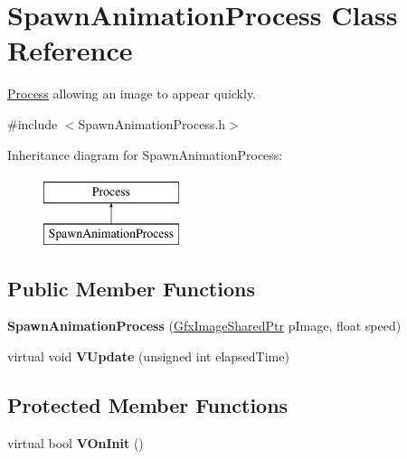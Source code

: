 \hypertarget{classSpawnAnimationProcess}{\section{Spawn\-Animation\-Process Class Reference}
\label{classSpawnAnimationProcess}
}


\hyperlink{classProcess}{Process} allowing an image to appear quickly.  




{\ttfamily \#include $<$Spawn\-Animation\-Process.\-h$>$}

Inheritance diagram for Spawn\-Animation\-Process\-:\begin{figure}[H]
\begin{center}
\leavevmode
\includegraphics[height=2.000000cm]{classSpawnAnimationProcess}
\end{center}
\end{figure}
\subsection*{Public Member Functions}
\begin{DoxyCompactItemize}
\item 
\hypertarget{classSpawnAnimationProcess_a74fbba9846f1148750f8817cd81eafb3}{{\bfseries Spawn\-Animation\-Process} (\hyperlink{GfxImage_8h_a42b2baf6110731a1a358d365e303e086}{Gfx\-Image\-Shared\-Ptr} p\-Image, float speed)}\label{classSpawnAnimationProcess_a74fbba9846f1148750f8817cd81eafb3}

\item 
\hypertarget{classSpawnAnimationProcess_a208194c75a8af12d0cc68f07c5ab6462}{virtual void {\bfseries V\-Update} (unsigned int elapsed\-Time)}\label{classSpawnAnimationProcess_a208194c75a8af12d0cc68f07c5ab6462}

\end{DoxyCompactItemize}
\subsection*{Protected Member Functions}
\begin{DoxyCompactItemize}
\item 
\hypertarget{classSpawnAnimationProcess_a030469d6ea77aca387790300df28ab40}{virtual bool {\bfseries V\-On\-Init} ()}\label{classSpawnAnimationProcess_a030469d6ea77aca387790300df28ab40}

\end{DoxyCompactItemize}


